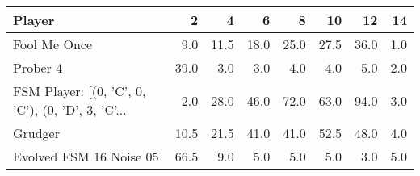 \begin{tabular}{lrrrrrrr}
\toprule
                                            Player &     2 &     4 &     6 &     8 &    10 &    12 &   14 \\
\midrule
                                      Fool Me Once &   9.0 &  11.5 &  18.0 &  25.0 &  27.5 &  36.0 &  1.0 \\
                                          Prober 4 &  39.0 &   3.0 &   3.0 &   4.0 &   4.0 &   5.0 &  2.0 \\
 FSM Player: [(0, 'C', 0, 'C'), (0, 'D', 3, 'C'... &   2.0 &  28.0 &  46.0 &  72.0 &  63.0 &  94.0 &  3.0 \\
                                           Grudger &  10.5 &  21.5 &  41.0 &  41.0 &  52.5 &  48.0 &  4.0 \\
                           Evolved FSM 16 Noise 05 &  66.5 &   9.0 &   5.0 &   5.0 &   5.0 &   3.0 &  5.0 \\
\bottomrule
\end{tabular}
